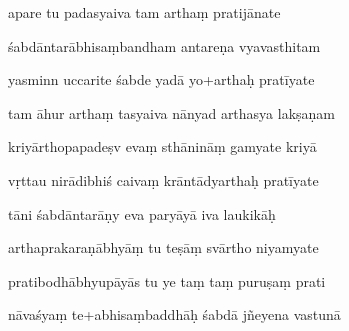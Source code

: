\documentclass[article,12pt,a4paper]{memoir}%
\newcounter{parCount}
\begin{document}
	  
	  \pstart {} apare tu padasyaiva tam arthaṃ pratijānate 
	{}
	\pend%
      

	  
	  \pstart \leavevmode%
	śabdāntarābhisaṃbandham antareṇa vyavasthitam 
	{}
	\pend%
      

	  
	  \pstart {} yasminn uccarite śabde yadā yo+arthaḥ pratīyate 
	{}
	\pend%
      

	  
	  \pstart \leavevmode%
	tam āhur arthaṃ tasyaiva nānyad arthasya lakṣaṇam 
	{}
	\pend%
      

	  
	  \pstart {} kriyārthopapadeṣv evaṃ sthānināṃ gamyate kriyā 
	{}
	\pend%
      

	  
	  \pstart \leavevmode%
	vṛttau nirādibhiś caivaṃ krāntādyarthaḥ pratīyate 
	{}
	\pend%
      

	  
	  \pstart {} tāni śabdāntarāṇy eva paryāyā iva laukikāḥ 
	{}
	\pend%
      

	  
	  \pstart \leavevmode%
	arthaprakaraṇābhyāṃ tu teṣāṃ svārtho niyamyate 
	{}
	\pend%
      

	  
	  \pstart {} pratibodhābhyupāyās tu ye taṃ taṃ puruṣaṃ prati 
	{}
	\pend%
      

	  
	  \pstart \leavevmode%
	nāvaśyaṃ te+abhisaṃbaddhāḥ śabdā jñeyena vastunā 
	{}
	\pend%
      
\end{document}
